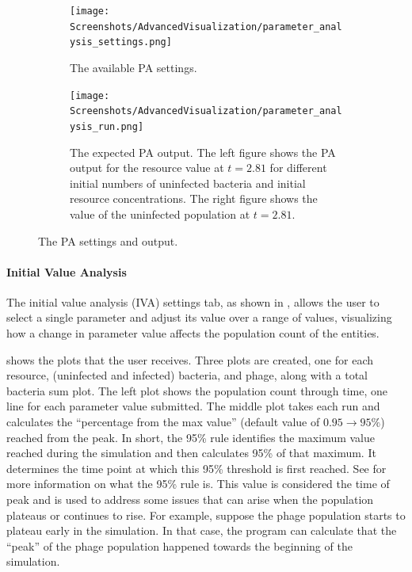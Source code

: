 \begin{figure}[h!]
    \centering
    \begin{subfigure}{0.49\linewidth}
        \centering
        \captionsetup{width=1\linewidth}
        \texttt{[image: Screenshots/AdvancedVisualization/parameter\_analysis\_settings.png]}
        \caption{
            The available PA settings. 
        }
        \label{fig:ss:av:parameter_analysis_settings}
    \end{subfigure}
    \hfill
    \begin{subfigure}{0.49\linewidth}
        \centering
        \captionsetup{width=1\linewidth}
        \texttt{[image: Screenshots/AdvancedVisualization/parameter\_analysis\_run.png]}
        \caption{
            The expected PA output. 
            The left figure shows the PA output for the resource value at $t=2.81$ for different initial numbers of uninfected bacteria and initial resource concentrations. 
            The right figure shows the value of the uninfected population at $t=2.81$. 
        }
        \label{fig:ss:av:parameter_analysis_run}
    \end{subfigure}
    \caption{The PA settings and output.}
\end{figure}

\paragraph{Initial Value Analysis}
\label{sec:initial_value_analysis}
The initial value analysis (IVA) settings tab, as shown in , allows the user to select a single parameter and adjust its value over a range of values, visualizing how a change in parameter value affects the population count of the entities.

 shows the plots that the user receives.
Three plots are created, one for each resource, (uninfected and infected) bacteria, and phage, along with a total bacteria sum plot. 
The left plot shows the population count through time, one line for each parameter value submitted.
The middle plot takes each run and calculates the “percentage from the max value” (default value of $0.95 \rightarrow 95\%$) reached from the peak.
In short, the 95\% rule identifies the maximum value reached during the simulation and then calculates 95\% of that maximum. 
It determines the time point at which this 95\% threshold is first reached.
See  for more information on what the 95\% rule is. 
This value is considered the time of peak and is used to address some issues that can arise when the population plateaus or continues to rise.
For example, suppose the phage population starts to plateau early in the simulation. 
In that case, the program can calculate that the “peak” of the phage population happened towards the beginning of the simulation. 

